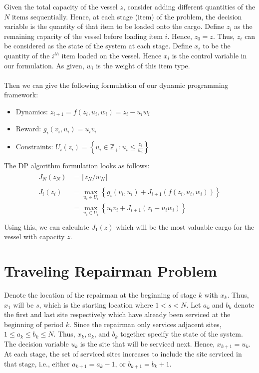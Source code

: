 \documentclass[11pt, oneside]{article}   	%
\begin{document}
Given the total capacity of the vessel $z$, consider adding different quantities of the $N$ items sequentially. Hence, at each stage (item) of the problem, the decision variable is the quantity of that item to be loaded onto the cargo. Define $z_i$ as the remaining capacity of the vessel before loading item $i$. Hence, $z_0 = z$. Thus, $z_i$ can be considered as the state of the system at each stage. Define $x_i$ to be the quantity of the $i^{th}$ item loaded on the vessel. Hence $x_i$ is the control variable in our formulation. As given, $w_i$ is the weight of this item type.\\\\
Then we can give the following formulation of our dynamic programming framework:
\begin{itemize}
\item Dynamics: $z_{i+1} = f(z_i,u_i,w_i) = z_i - u_i w_i$
\item Reward: $g_i(v_i, u_i) = u_i v_i$
\item Constraints: $U_i(z_i) = \left\{ u_i \in \mathbb{Z}_+ : u_i \leq \frac{z_i}{w_i} \right\}$
\end{itemize}
The DP algorithm formulation looks as follows:
\begin{align*}
\begin{split}
J_{N}(z_{N}) &= \lfloor{z_N/w_N}\rfloor
\\\\
J_i(z_i) &= \max_{u_i \in U_i} \left\{ g_i(v_i, u_i) + J_{i+1}(f(z_i, u_i, w_i)) \right\}\\
&= \max_{u_i \in U_i} \left\{ u_i v_i + J_{i+1}(z_i - u_i w_i) \right\}\\
\end{split}
\end{align*}
Using this, we can calculate $J_1(z)$ which will be the most valuable cargo for the vessel with capacity $z$.


\section{Traveling Repairman Problem}

Denote the location of the repairman at the beginning of stage $k$ with $x_k$. Thus, $x_1$ will be $s$, which is the starting location where $1 < s < N$. Let $a_k$ and $b_k$ denote the first and last site respectively which have already been serviced at the beginning of period $k$. Since the repairman only services adjacent sites, $1 \leq a_k \leq b_k \leq N$. Thus, $x_k, a_k$, and $b_k$ together specify the state of the system. The decision variable $u_k$ is the site that will be serviced next. Hence, $x_{k+1} = u_k$. At each stage, the set of serviced sites increases to include the site serviced in that stage, i.e., either $a_{k+1} = a_k -1$, or $b_{k+1} = b_k +1$.
\end{document}
